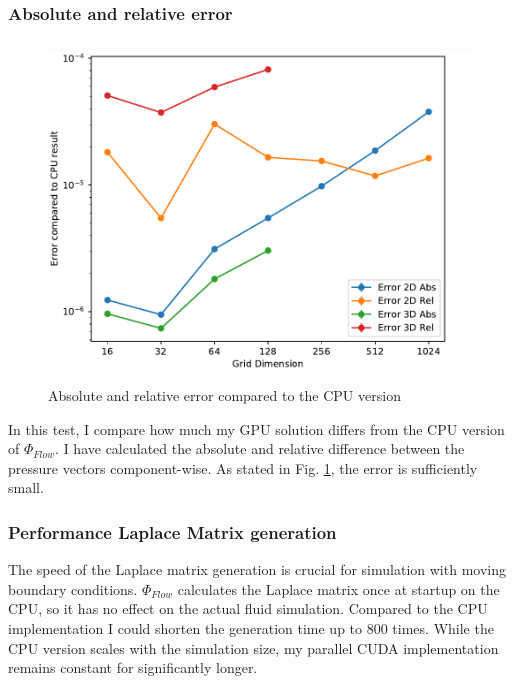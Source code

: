 \subsubsection{Absolute and relative error}
\begin{figure}[t]
\centering
	\includegraphics[height=9cm, width=14cm]{figures/error}
\caption{Absolute and relative error compared to the CPU version} \label{fig:error}
\end{figure}
In this test, I compare how much my GPU solution differs from the CPU version of $\Phi_{Flow}$. I have calculated the absolute and relative difference between the pressure vectors component-wise. As stated in Fig. \ref{fig:error}, the error is sufficiently small.

\clearpage
\subsubsection{Performance Laplace Matrix generation}
The speed of the Laplace matrix generation is crucial for simulation with moving boundary conditions. $\Phi_{Flow}$ calculates the Laplace matrix once at startup on the CPU, so it has no effect on the actual fluid simulation. Compared to the CPU implementation I could shorten the generation time up to 800 times.  While the CPU version scales with the simulation size, my parallel CUDA implementation remains constant for significantly longer.

